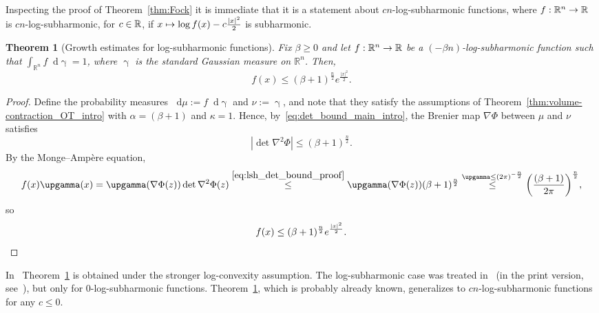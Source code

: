 \documentclass[10pt]{amsart}
\newtheorem{theo}{Theorem}[section]
\theoremstyle{definition}\newtheorem{defi}[theo]{Definition}\newtheorem{rema}[theo]{Remark}\newtheorem{exam}[theo]{Example}\newtheorem{exem}[theo]{Example}\newtheorem{nota}[theo]{Notation}
\newcommand{\R}{\mathbb R}
\newcommand{\dd}{n}
\newcommand{\conv}{c}
\newcommand{\density}{f}
\newcommand{\source}{\mu}
\newcommand{\target}{\nu}
\newcommand{\lsh}{\alpha}
\newcommand{\lc}{\kappa}
\newcommand*\diff{\mathop{}\!\mathrm{d}}
\newcommand{\Gaussian}{\upgamma}
\newcommand{\OT}{\Phi}
\renewcommand*{\to}{\mathchoice{\longrightarrow}{\rightarrow}{\rightarrow}{\rightarrow}}
\let\oldmapsto\mapsto
\renewcommand*{\mapsto}{\mathchoice{\longmapsto}{\oldmapsto}{\oldmapsto}{\oldmapsto}}
\let\originalleft\left
\let\originalright\right
\renewcommand{\left}{\mathopen{}\mathclose\bgroup\originalleft}
\renewcommand{\right}{\aftergroup\egroup\originalright}
\let\oldin\in
\renewcommand{\in}{\mathchoice{\oldin}{\oldin}{\,\oldin\,}{\,\oldin\,}}
\begin{document}
Inspecting the proof of Theorem~\ref{thm:Fock} it is immediate that it is a statement about $\conv\dd$-log-subharmonic functions, where $\density:\R^{\dd}\to\R$ is $\conv\dd$-log-subharmonic, for $\conv\in \R$, if $x\mapsto \log f(x)-\conv\frac{|x|^2}{2}$ is subharmonic.

\begin{theo}[Growth estimates for log-subharmonic functions]\label{thm:lsh_bound}
Fix $\beta\ge 0$ and let $\density:\R^{\dd}\to\R$ be a $(-\beta\dd)$-log-subharmonic function such that $\int_{\R^{\dd}}\density \diff\Gaussian=1$, where $\Gaussian$ is the standard Gaussian measure on $\R^{\dd}$. Then,
\begin{equation}\label{eq:lsh_bound}
f(x)\le (\beta+1)^{\frac{\dd}{2}}e^{\frac{|x|^2}{2}}.
\end{equation}
\end{theo}
\begin{proof}
Define the probability measures $\diff\source:=\density\diff\Gaussian$ and $\target:=\Gaussian$, and note that they satisfy the assumptions of Theorem~\ref{thm:volume-contraction_OT_intro} with $\lsh=(\beta+1)$ and $\lc=1$. Hence, by~\eqref{eq:det_bound_main_intro}, the Brenier map $\nabla\OT$ between $\source$ and $\target$ satisfies
\begin{equation}\label{eq:lsh_det_bound_proof}
|\det\nabla^2\OT|\le (\beta+1)^{\frac{\dd}{2}}.
\end{equation}
By the Monge--Ampère equation,
\begin{align*}
\density(x)\Gaussian(x)= \Gaussian(\nabla\OT(z))\det\nabla^2\OT(z)\overset{\eqref{eq:lsh_det_bound_proof}}{\le } \Gaussian(\nabla\OT(z))(\beta+1)^{\frac{\dd}{2}}\overset{\Gaussian\le (2\pi)^{-\frac{\dd}{2}}}{\le} \left(\frac{(\beta+1)}{2\pi}\right)^{\frac{\dd}{2}},
\end{align*}
so
\[
f(x)\le (\beta+1)^{\frac{\dd}{2}}e^{\frac{|x|^2}{2}}.\qedhere
\]
\end{proof}

In~\cite[Lemma~2.1]{MR3723580} Theorem~\ref{thm:lsh_bound} is obtained under the stronger log-convexity assumption. The log-subharmonic case was treated in~\cite{MR2578455} (in the print version, see~\cite[Remark~2.2]{MR3723580}), but only for $0$-log-subharmonic functions. Theorem~\ref{thm:lsh_bound}, which is probably already known, generalizes to $\conv\dd$-log-subharmonic functions for any $\conv\le 0$.
\end{document}
